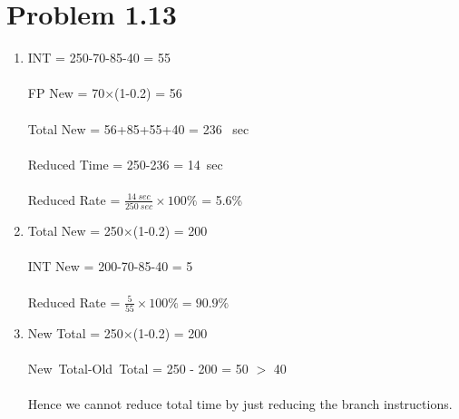\documentclass[]{article}
\begin{document}
\section*{Problem 1.13}
\begin{enumerate}[(1)]
\item INT = 250-70-85-40 = 55\\\\
FP New = 70$\times$(1-0.2) = 56\\\\
Total New = 56+85+55+40 = 236 \ sec\\\\
Reduced Time = 250-236 = 14\ sec\\\\
Reduced Rate = $\frac{14\ sec}{250\ sec}\times 100\%$ = 5.6\%\\
\item Total New = 250$\times$(1-0.2) = 200\\\\
INT New = 200-70-85-40 = 5\\\\
Reduced Rate = $\frac{5}{55}\times 100\% = 90.9\%$
\item New Total = 250$\times$(1-0.2) = 200\\\\
New\ Total-Old\ Total = 250 - 200 = 50 $>$ 40\\\\
Hence we cannot reduce total time by just reducing the branch instructions.\\
\end{enumerate}
\newpage
\end{document}
